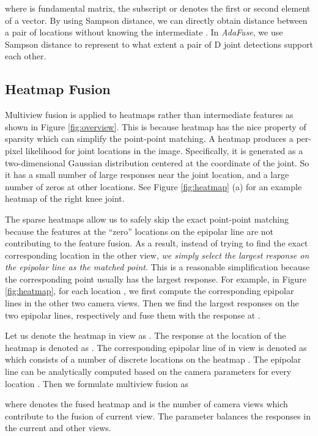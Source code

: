{where  is fundamental matrix, the subscript  or  denotes the first or second element of a vector. By using Sampson distance, we can directly obtain distance between a pair of locations without knowing the intermediate . In \emph{AdaFuse}, we use Sampson distance to represent to what extent a pair of D joint detections support each other.}




\subsection{Heatmap Fusion}
\label{sec:heatmap}
Multiview fusion is applied to heatmaps rather than intermediate features as shown in Figure \ref{fig:overview}. This is because heatmap has the nice property of sparsity which can simplify the point-point matching. A heatmap produces a per-pixel likelihood for joint locations in the image. Specifically, it is generated as a two-dimensional Gaussian distribution centered at the coordinate of the joint. So it has a small number of large responses near the joint location, and a large number of zeros at other locations. See Figure \ref{fig:heatmap} (a) for an example heatmap of the right knee joint.

The sparse heatmaps allow us to safely skip the exact point-point matching because the features at the ``zero'' locations on the epipolar line are not contributing to the feature fusion. As a result, instead of trying to find the exact corresponding location in the other view, \emph{we simply select the largest response on the epipolar line as the matched point}. This is a reasonable simplification because the corresponding point usually has the largest response. For example, in Figure \ref{fig:heatmap}, for each location , we first compute the corresponding epipolar lines in the other two camera views. Then we find the largest responses on the two epipolar lines, respectively and fuse them with the response at .

Let us denote the heatmap in view  as . The response at the location  of the heatmap is denoted as . The corresponding epipolar line of  in view  is denoted as  which consists of a number of discrete locations on the heatmap . The epipolar line can be analytically computed based on the camera parameters for every location . Then we formulate multiview fusion as


where  denotes the fused heatmap and  is the number of camera views which contribute to the fusion of current view. The parameter  balances the responses in the current and other views.


